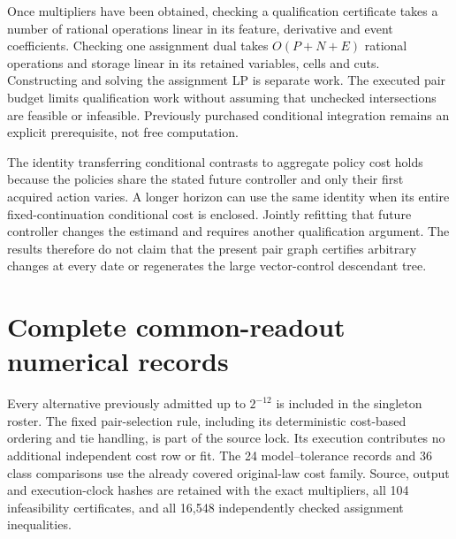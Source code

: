 Once multipliers have been obtained, checking a qualification certificate takes a number of rational operations linear in its feature, derivative and event coefficients. Checking one assignment dual takes $O(P+N+E)$ rational operations and storage linear in its retained variables, cells and cuts. Constructing and solving the assignment LP is separate work. The executed pair budget limits qualification work without assuming that unchecked intersections are feasible or infeasible. Previously purchased conditional integration remains an explicit prerequisite, not free computation.

The identity transferring conditional contrasts to aggregate policy cost holds because the policies share the stated future controller and only their first acquired action varies. A longer horizon can use the same identity when its entire fixed-continuation conditional cost is enclosed. Jointly refitting that future controller changes the estimand and requires another qualification argument. The results therefore do not claim that the present pair graph certifies arbitrary changes at every date or regenerates the large vector-control descendant tree.

\section{Complete common-readout numerical records}\label{app:records84}



Every alternative previously admitted up to $2^{-12}$ is included in the singleton roster. The fixed pair-selection rule, including its deterministic cost-based ordering and tie handling, is part of the source lock. Its execution contributes no additional independent cost row or fit. The 24 model--tolerance records and 36 class comparisons use the already covered original-law cost family. Source, output and execution-clock hashes are retained with the exact multipliers, all 104 infeasibility certificates, and all 16,548 independently checked assignment inequalities.
